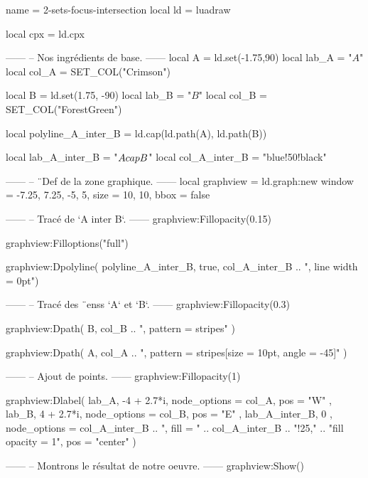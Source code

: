 \documentclass[border = 3pt]{standalone}
\begin{document}
\begin{luadraw*}{name = 2-sets-focus-intersection}
local ld = luadraw

local cpx = ld.cpx

------
-- Nos ingrédients de base.
------
local A     = ld.set(-1.75,90)
local lab_A = "$A$"
local col_A = SET_COL("Crimson")

local B     = ld.set(1.75, -90)
local lab_B = "$B$"
local col_B = SET_COL("ForestGreen")

local polyline_A_inter_B = ld.cap(ld.path(A), ld.path(B))

local lab_A_inter_B = "$A \\cap B$"
local col_A_inter_B = "blue!50!black"

------
-- ¨Def de la zone graphique.
------
local graphview = ld.graph:new{
  window = {-7.25, 7.25, -5, 5},
  size   = {10, 10},
  bbox   = false
}

------
-- Tracé de `A inter B`.
------
graphview:Fillopacity(0.15)

graphview:Filloptions("full")

graphview:Dpolyline(
  polyline_A_inter_B,
  true,
  col_A_inter_B .. ", line width = 0pt")

------
-- Tracé des ¨enss `A` et `B`.
------
graphview:Fillopacity(0.3)

graphview:Dpath(
  B,
  col_B .. ", pattern = stripes"
)

graphview:Dpath(
  A,
  col_A .. ", pattern = {stripes[size = 10pt, angle = -45]}"
)


------
-- Ajout de points.
------
graphview:Fillopacity(1)

graphview:Dlabel(
  lab_A, -4 + 2.7*i,
  {
    node_options = col_A,
    pos          = "W"
  },
  lab_B, 4 + 2.7*i,
  {
    node_options = col_B,
    pos          = "E"
  },
  lab_A_inter_B, 0 ,
  {
    node_options = col_A_inter_B ..
                   ", fill = " .. col_A_inter_B .. "!25," ..
                   "fill opacity = 1",
    pos = "center"
  }
)

------
-- Montrons le résultat de notre oeuvre.
------
graphview:Show()
\end{luadraw*}
\end{document}
